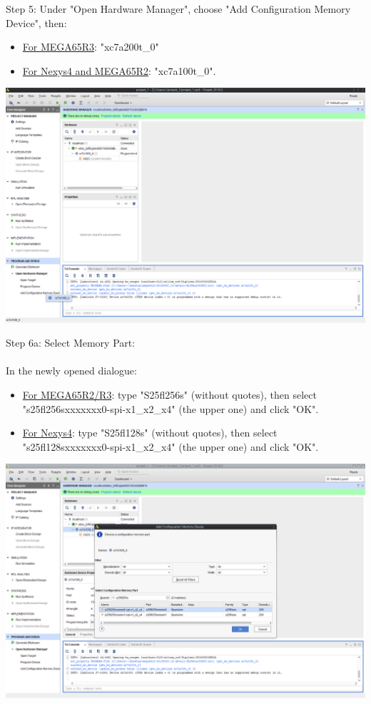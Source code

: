 \begin{minipage}{\linewidth}
  Step 5: Under "Open Hardware Manager", choose "Add Configuration
  Memory Device", then:
  \begin{itemize}
    \item \underline{For MEGA65R3}: "xc7a200t\_0"
    \item \underline{For Nexys4 and MEGA65R2}: "xc7a100t\_0".
  \end{itemize}

  \begin{center}
    \includegraphics[width=0.7\linewidth]{images/vivado05.png}
  \end{center}
\end{minipage}

\vspace{5mm}

\begin{minipage}{\linewidth}
  Step 6a: Select Memory Part: \\
  \\
  In the newly opened dialogue:
  \begin{itemize}
    \item \underline{For MEGA65R2/R3}: type "S25fl256s"
    (without quotes), then select "s25fl256sxxxxxxx0-spi-x1\_x2\_x4"
    (the upper one) and click "OK".
    \item \underline{For Nexys4}: type "S25fl128s"
    (without quotes), then select "s25fl128sxxxxxxx0-spi-x1\_x2\_x4"
    (the upper one) and click "OK".
  \end{itemize}

  \begin{center}
    \includegraphics[width=0.7\linewidth]{images/vivado06.png}
  \end{center}
\end{minipage}

